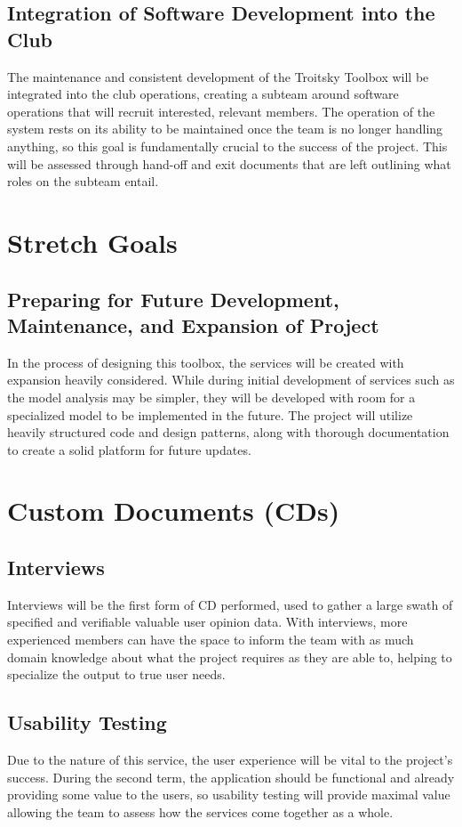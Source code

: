 \documentclass{article}
\begin{document}
\subsection{Integration of Software Development into the Club}
The maintenance and consistent development of the Troitsky Toolbox will be integrated into the club operations, 
creating a subteam around software operations that will recruit interested, relevant members. The operation of the system 
rests on its ability to be maintained once the team is no longer handling anything, so this goal is fundamentally crucial 
to the success of the project. This will be assessed through hand-off and exit documents that are left outlining what roles 
on the subteam entail.

\section{Stretch Goals}

\subsection{Preparing for Future Development, Maintenance, and Expansion of Project}
In the process of designing this toolbox, the services will be created with expansion heavily considered. While 
during initial development of services such as the model analysis may be simpler, they will be developed with 
room for a specialized model to be implemented in the future. The project will utilize heavily structured code 
and design patterns, along with thorough documentation to create a solid platform for future updates.

\section{Custom Documents (CDs)}

\subsection{Interviews}
Interviews will be the first form of CD performed, used to gather a large swath of specified and verifiable valuable 
user opinion data. With interviews, more experienced members can have the space to inform the team with as much domain knowledge 
about what the project requires as they are able to, helping to specialize the output to true user needs.

\subsection{Usability Testing}
Due to the nature of this service, the user experience will be vital to the project's success. During the second term, 
the application should be functional and already providing some value to the users, so usability testing will provide maximal value 
allowing the team to assess how the services come together as a whole. 
\end{document}
